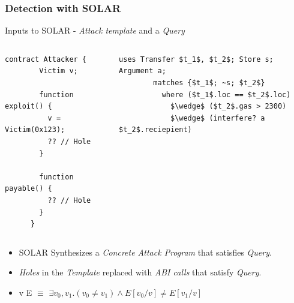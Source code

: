 \documentclass{beamer}
\begin{document}
\begin{frame}[fragile]
  \frametitle{Detection with SOLAR}
  Inputs to SOLAR - \textit{Attack template} and a \textit{Query}

  \begin{columns}[T]
    \begin{column}{0.4\textwidth}
      \begin{lstlisting}[language=Solidity, style=transitions, numbers=none]
      contract Attacker {
        Victim v;

        function exploit() {
          v = Victim(0x123);
          ?? // Hole
        }

        function payable() {
          ?? // Hole
        }
      }
      \end{lstlisting}
    \end{column}
      \pause
    \begin{column}{0.6\textwidth}
      \begin{lstlisting}[language=Solar, numbers=none]
        uses Transfer $t_1$, $t_2$; Store s; Argument a;
        matches {$t_1$; ~s; $t_2$}
          where ($t_1$.loc == $t_2$.loc)
            $\wedge$ ($t_2$.gas > 2300)
            $\wedge$ (interfere? a $t_2$.reciepient)
      \end{lstlisting}
    \end{column}
  \end{columns}
  \pause
  \begin{itemize}
    \item \scriptsize{SOLAR Synthesizes a \textit{Concrete Attack Program} that
      satisfies \textit{Query}}.
    \item \scriptsize{\textit{Holes} in the \textit{Template} replaced with
      \textit{ABI calls} that satisfy \textit{Query}.}
    \item {} v E $\equiv$  $\exists v_0, v_1 . (v_0 \neq
      v_1) \wedge E[v_0 / v] \neq E[v_1 /v]$
\end{itemize}
\end{frame}
\end{document}
